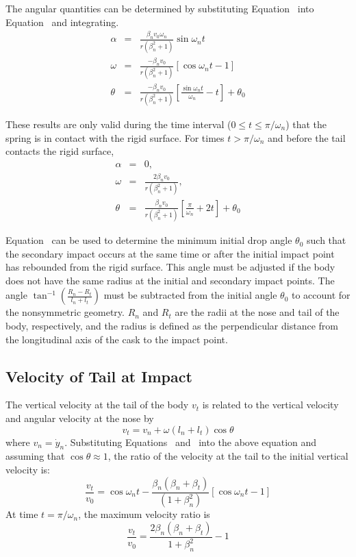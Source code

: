 The angular quantities can be determined by substituting 
Equation~ into Equation~ and integrating.
\begin{eqnarray}
\alpha & = & \frac{\beta_n v_0\omega_n}{r(\beta_n^2+1)}\sin\omega_n t\\
\omega & = & \frac{-\beta_n v_0}{r(\beta_n^2+1)}[\cos\omega_n t - 1]
               \label{eq:omega}\\
\theta & = & \frac{-\beta_n v_0}{r(\beta_n^2+1)}
                \left[\frac{\sin\omega_n t}{\omega_n} - t\right] + \theta_0
\label{etheta}
\end{eqnarray}

These results are only valid during the time interval ($0\leq t\leq \pi
/ \omega_n$) that the spring is in contact with the rigid surface.  For
times $t>\pi/\omega_n$ and before the tail contacts the rigid
surface, 
\begin{eqnarray}
\alpha & = & 0, \\
\omega & = & \frac{2\beta_n v_0}{r(\beta_n^2+1)},\\
\theta & = & \frac{\beta_n v_0}{r(\beta_n^2+1)}\left[\frac{\pi}{\omega_n}
      + 2t\right] + \theta_0\label{e12}
\end{eqnarray}

Equation~ can be used to determine the minimum initial drop angle
$\theta_0$ such that the secondary impact occurs at the same time or
after the initial impact point has rebounded from the rigid surface.
This angle must be adjusted if the body does not have the same radius at
the initial and secondary impact points. The angle
$\tan^{-1}\left(\frac{R_n-R_t}{l_n+l_t}\right)$ must be subtracted from
the initial angle $\theta_0$ to account for the nonsymmetric geometry.
$R_n$ and $R_t$ are the radii at the nose and tail of the body,
respectively, and the radius is defined as the perpendicular distance
from the longitudinal axis of the cask to the impact point.  

\subsection{Velocity of Tail at Impact}

The vertical velocity at the tail of the body $v_t$ is related to
the vertical velocity and angular velocity at the nose by 
\begin{equation}
v_t = v_n + \omega(l_n + l_t)\cos\theta
\end{equation}
where $v_n = \dot y_n$. 
Substituting Equations~ and~ into the above
equation and assuming that $\cos\theta\approx 1$, the ratio of the velocity
at the tail to the initial vertical velocity is:
\begin{equation}
\frac{v_t}{v_0} = \cos\omega_nt - \frac{\beta_n(\beta_n+\beta_t)}
{(1+\beta_n^2)}\left[\cos\omega_n t-1\right]\label{eq:vrv0t}
\end{equation}
At time $t = \pi/\omega_n$, the maximum velocity ratio is
\begin{equation}
\frac{v_t}{v_0} = \frac{2\beta_n(\beta_n+\beta_t)}{1+\beta_n^2} - 1
\label{eq:vrv0}
\end{equation}

